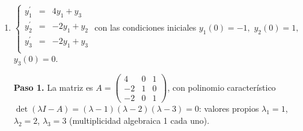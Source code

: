 \begin{prob}
\begin{enumerate}[$(a)$]
\begin{myproof}
\textbf{Paso 1.} $A = \begin{pmatrix} 4 & 1 \\ 3 & 2 \end{pmatrix}$, con polinomio característico $\lambda^2 - 6\lambda + 5 = 0 \implies \lambda_1=5, \lambda_2=1$.

\textbf{Paso 2.} Vectores propios: para $\lambda=5$, $\mathbf{v}_1 = \begin{pmatrix} 1 \\ 1 \end{pmatrix}$; para $\lambda=1$, $\mathbf{v}_2 = \begin{pmatrix} 1 \\ -3 \end{pmatrix}$.

\textbf{Paso 3.} Solución general:
\[
\mathbf{y}(x) = c_1 e^{5x} \begin{pmatrix} 1 \\ 1 \end{pmatrix} + c_2 e^{x} \begin{pmatrix} 1 \\ -3 \end{pmatrix}
\]

\textbf{Paso 4.} Con las condiciones iniciales $y_1(0)=1$, $y_2(0)=5$:
\[
\begin{cases}
c_1 + c_2 = 1 \\
c_1 - 3c_2 = 5
\end{cases}
\implies c_1 = 2,\ c_2 = -1
\]
Solución particular:
\[
\boxed{y_1(x) = 2e^{5x} - e^{x},\quad y_2(x) = 2e^{5x} + 3e^{x}.}
\]
\end{myproof}

\item $\left\lbrace \begin{matrix}
y_{1}^{\prime}&=&4y_1+y_3\\
y_{2}^{\prime}&=&-2y_1+y_2\\
y_{3}^{\prime}&=&-2y_1+y_3\\
\end{matrix} \right. $ con las condiciones iniciales $y_{1}(0)=-1,$ $y_{2}(0)=1,$ $y_3(0)=0.$

\begin{myproof}
\textbf{Paso 1.} La matriz es $A = \begin{pmatrix} 4 & 0 & 1 \\ -2 & 1 & 0 \\ -2 & 0 & 1 \end{pmatrix}$, con polinomio característico $\det(\lambda I - A) = (\lambda-1)(\lambda-2)(\lambda-3) = 0$: valores propios $\lambda_1=1$, $\lambda_2=2$, $\lambda_3=3$ (multiplicidad algebraica 1 cada uno).


\end{myproof}
\end{enumerate}
\end{prob}
